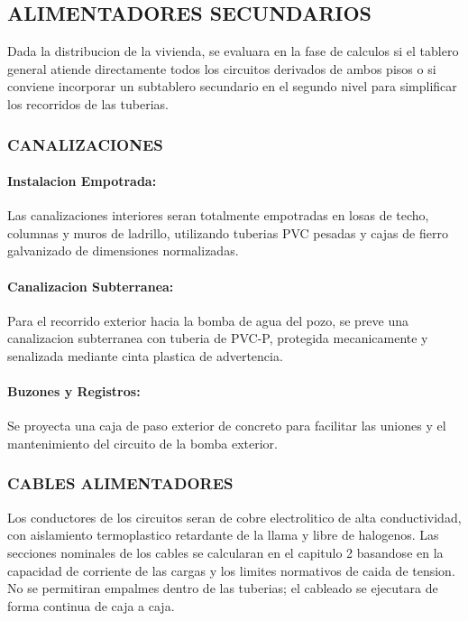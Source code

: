 \subsection{ALIMENTADORES SECUNDARIOS}

Dada la distribucion de la vivienda, se evaluara en la fase de calculos si el tablero general atiende directamente todos los circuitos derivados de ambos pisos o si conviene incorporar un subtablero secundario en el segundo nivel para simplificar los recorridos de las tuberias.

\subsubsection{CANALIZACIONES}

\paragraph{Instalacion Empotrada:} Las canalizaciones interiores seran totalmente empotradas en losas de techo, columnas y muros de ladrillo, utilizando tuberias PVC pesadas y cajas de fierro galvanizado de dimensiones normalizadas.
\paragraph{Canalizacion Subterranea:} Para el recorrido exterior hacia la bomba de agua del pozo, se preve una canalizacion subterranea con tuberia de PVC-P, protegida mecanicamente y senalizada mediante cinta plastica de advertencia.
\paragraph{Buzones y Registros:} Se proyecta una caja de paso exterior de concreto para facilitar las uniones y el mantenimiento del circuito de la bomba exterior.

\subsubsection{CABLES ALIMENTADORES}

Los conductores de los circuitos seran de cobre electrolitico de alta conductividad, con aislamiento termoplastico retardante de la llama y libre de halogenos. Las secciones nominales de los cables se calcularan en el capitulo 2 basandose en la capacidad de corriente de las cargas y los limites normativos de caida de tension. No se permitiran empalmes dentro de las tuberias; el cableado se ejecutara de forma continua de caja a caja.

